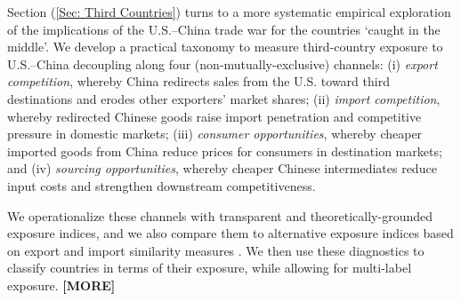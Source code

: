 \documentclass[english,12pt]{article}
\theoremstyle{definition}
\let\oldref\ref
\renewcommand{\ref}[1]{(\oldref{#1})}
\begin{document}
Section \ref{Sec: Third Countries} turns to a more systematic empirical exploration of the
implications of the U.S.--China trade war for the countries `caught in the
middle'. We develop a practical taxonomy to measure third-country exposure
to U.S.--China decoupling along four (non-mutually-exclusive) channels: (i) 
\emph{export competition}, whereby China redirects sales from the U.S.
toward third destinations and erodes other exporters' market shares; (ii) 
\emph{import competition}, whereby redirected Chinese goods raise import
penetration and competitive pressure in domestic markets; (iii) \emph{consumer
opportunities}, whereby cheaper imported goods from China reduce prices for 
consumers in destination markets; and (iv) \emph{sourcing opportunities}, 
whereby cheaper Chinese intermediates reduce input
costs and strengthen downstream competitiveness. 

We operationalize these channels with transparent and theoretically-grounded
exposure indices, and we also compare them to alternative exposure indices
based on export and import similarity measures %
\citep[cf.][]{FingerKreinin1979ExportSimilarity}. We then use these
diagnostics to classify countries in terms of their exposure, while allowing
for multi-label exposure. \textbf{[MORE]}

\end{document}
